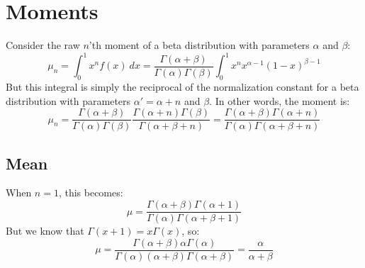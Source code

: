 \documentclass[12pt, a4paper]{article}
\begin{document}

\section{Moments}
Consider the raw $n$'th moment of a beta distribution with parameters $\alpha$ and $\beta$:
\begin{equation}
\mu_n=\int_0^1 x^n f(x)\ dx=\frac{\Gamma(\alpha+\beta)}{\Gamma(\alpha)\Gamma(\beta)}\int_0^1 x^n x^{\alpha-1}(1-x)^{\beta-1}
\end{equation}
But this integral is simply the reciprocal of the normalization constant for a beta distribution with parameters $\alpha'=\alpha+n$ and $\beta$. In other words, the moment is:
\begin{equation}
\mu_n=\frac{\Gamma(\alpha+\beta)}{\Gamma(\alpha)\Gamma(\beta)}\frac{\Gamma(\alpha+n)\Gamma(\beta)}{\Gamma(\alpha+\beta+n)}=\frac{\Gamma(\alpha+\beta)\Gamma(\alpha+n)}{\Gamma(\alpha)\Gamma(\alpha+\beta+n)}
\end{equation}

\subsection{Mean}
When $n=1$, this becomes:
\begin{equation}
\mu=\frac{\Gamma(\alpha+\beta)\Gamma(\alpha+1)}{\Gamma(\alpha)\Gamma(\alpha+\beta+1)}
\end{equation}
But we know that $\Gamma(x+1)=x\Gamma(x)$, so:
\begin{equation}
\mu=\frac{\Gamma(\alpha+\beta)\alpha\Gamma(\alpha)}{\Gamma(\alpha)(\alpha+\beta)\Gamma(\alpha+\beta)}=\frac{\alpha}{\alpha+\beta}
\end{equation}
\end{document}
